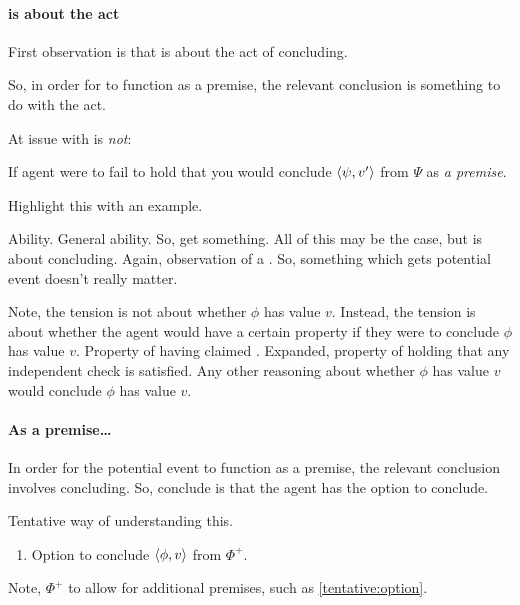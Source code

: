 \paragraph{\qzS{} is about the act}

\begin{note}
  First observation is that \qzS{} is about the act of concluding.

  So, in order for \fc{} to function as a premise, the relevant conclusion is something to do with the act.
\end{note}

\begin{note}
  At issue with \qzS{} is \emph{not}:

  If agent were to fail to hold that you would conclude \(\langle \psi, v' \rangle\) from \(\Psi\) as \emph{a premise}.
\end{note}

\begin{note}
  Highlight this with an example.

  Ability.
  General ability.
  So, get something.
  All of this may be the case, but \requ{} is about concluding.
  Again, observation of a \deadEnd{}.
  So, something which gets potential event doesn't really matter.
\end{note}

\begin{note}
  Note, the tension is not about whether \(\phi\) has value \(v\).
  Instead, the tension is about whether the agent would have a certain property if they were to conclude \(\phi\) has value \(v\).
  Property of having claimed \support{}.
  Expanded, property of holding that any independent check is satisfied.
  Any other reasoning about whether \(\phi\) has value \(v\) would conclude \(\phi\) has value \(v\).
\end{note}

\paragraph{As a premise\dots}

\begin{note}
  In order for the potential event to function as a premise, the relevant conclusion involves concluding.
  So, conclude is that the agent has the option to conclude.

  Tentative way of understanding this.
  \begin{enumerate}
  \item
    \label{tentative:option}
    Option to conclude \(\langle \phi, v \rangle\) from \(\Phi^{+}\).
  \end{enumerate}
  Note, \(\Phi^{+}\) to allow for additional premises, such as \ref{tentative:option}.
\end{note}

